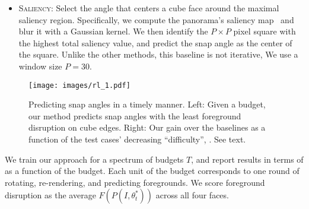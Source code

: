 \begin{itemize}
\item \textsc{Saliency}:  Select the angle that centers a cube face around the maximal saliency region.  Specifically, we compute the panorama's saliency map~\cite{liu2011learning}  and blur it with a Gaussian kernel.  We then identify the $P\times P$ pixel square with the highest total saliency value, and predict the snap angle as the center of the square. Unlike the other methods, this baseline is not iterative,   We use a window size $P=30$.
\end{itemize}







\begin{figure}[t]
\centering
\renewcommand{\tabcolsep}{0pt}
\texttt{[image: images/rl\_1.pdf]}\vspace*{-0.2in}
\caption{Predicting snap angles in a timely manner.  Left: Given a budget, our method predicts snap angles with the least foreground disruption on cube edges.     Right: Our gain over the baselines  as a function of the test cases' decreasing ``difficulty'', .  See text.}
\label{fig:rl}
\vspace{-0.18in}
\end{figure}



We train our approach for a spectrum of budgets $T$, and report results in terms of  as a function of the budget.  Each unit of the budget corresponds to one round of rotating, re-rendering, and predicting foregrounds.  We score foreground disruption as the average  $F(P(I,\theta_t^*))$ across all four faces.

